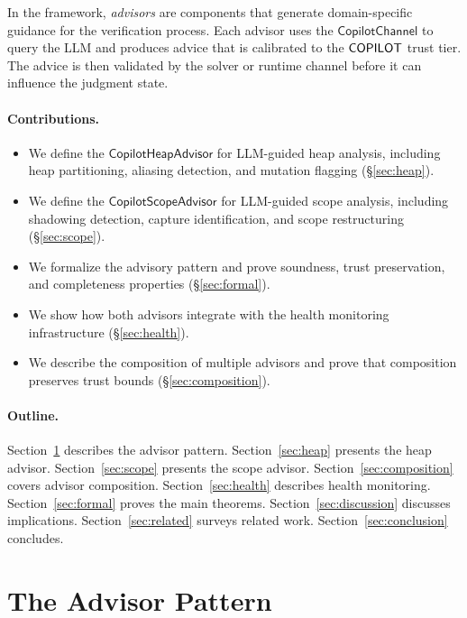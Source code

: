 \documentclass[11pt]{article}
\newcommand{\HeapAdv}{\mathsf{CopilotHeapAdvisor}}
\newcommand{\ScopeAdv}{\mathsf{CopilotScopeAdvisor}}
\newcommand{\CopChan}{\mathsf{CopilotChannel}}
\begin{document}
In the \JuGeo{} framework, \emph{advisors} are components that
generate domain-specific guidance for the verification process.
Each advisor uses the $\CopChan$ to query the LLM and produces
advice that is calibrated to the $\mathsf{COPILOT}$ trust tier.  The
advice is then validated by the solver or runtime channel before
it can influence the judgment state.

\paragraph{Contributions.}
\begin{itemize}[leftmargin=2em]
\item We define the $\HeapAdv$ for LLM-guided heap analysis,
  including heap partitioning, aliasing detection, and mutation
  flagging (\S\ref{sec:heap}).

\item We define the $\ScopeAdv$ for LLM-guided scope analysis,
  including shadowing detection, capture identification, and
  scope restructuring (\S\ref{sec:scope}).

\item We formalize the advisory pattern and prove soundness,
  trust preservation, and completeness properties
  (\S\ref{sec:formal}).

\item We show how both advisors integrate with the \JuGeo{}
  health monitoring infrastructure (\S\ref{sec:health}).

\item We describe the composition of multiple advisors and prove
  that composition preserves trust bounds (\S\ref{sec:composition}).
\end{itemize}

\paragraph{Outline.}
Section~\ref{sec:pattern} describes the advisor pattern.
Section~\ref{sec:heap} presents the heap advisor.
Section~\ref{sec:scope} presents the scope advisor.
Section~\ref{sec:composition} covers advisor composition.
Section~\ref{sec:health} describes health monitoring.
Section~\ref{sec:formal} proves the main theorems.
Section~\ref{sec:discussion} discusses implications.
Section~\ref{sec:related} surveys related work.
Section~\ref{sec:conclusion} concludes.

\section{The Advisor Pattern}
\label{sec:pattern}
\end{document}
